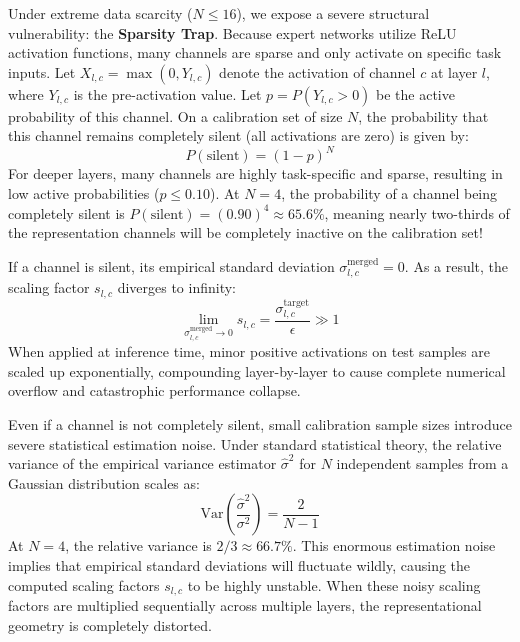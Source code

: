 \documentclass{article}
\begin{document}
Under extreme data scarcity ($N \le 16$), we expose a severe structural vulnerability: the \textbf{Sparsity Trap}. Because expert networks utilize ReLU activation functions, many channels are sparse and only activate on specific task inputs. Let $X_{l,c} = \max(0, Y_{l,c})$ denote the activation of channel $c$ at layer $l$, where $Y_{l,c}$ is the pre-activation value. Let $p = P(Y_{l,c} > 0)$ be the active probability of this channel. On a calibration set of size $N$, the probability that this channel remains completely silent (all activations are zero) is given by:
\begin{equation}
P(\text{silent}) = (1 - p)^N
\end{equation}
For deeper layers, many channels are highly task-specific and sparse, resulting in low active probabilities ($p \le 0.10$). At $N=4$, the probability of a channel being completely silent is $P(\text{silent}) = (0.90)^4 \approx 65.6\%$, meaning nearly two-thirds of the representation channels will be completely inactive on the calibration set!

If a channel is silent, its empirical standard deviation $\sigma^{\text{merged}}_{l,c} = 0$. As a result, the scaling factor $s_{l,c}$ diverges to infinity:
\begin{equation}
\lim_{\sigma^{\text{merged}}_{l,c} \to 0} s_{l,c} = \frac{\sigma^{\text{target}}_{l,c}}{\epsilon} \gg 1
\end{equation}
When applied at inference time, minor positive activations on test samples are scaled up exponentially, compounding layer-by-layer to cause complete numerical overflow and catastrophic performance collapse. 

Even if a channel is not completely silent, small calibration sample sizes introduce severe statistical estimation noise. Under standard statistical theory, the relative variance of the empirical variance estimator $\hat{\sigma}^2$ for $N$ independent samples from a Gaussian distribution scales as:
\begin{equation}
\text{Var}\left(\frac{\hat{\sigma}^2}{\sigma^2}\right) = \frac{2}{N-1}
\end{equation}
At $N=4$, the relative variance is $2/3 \approx 66.7\%$. This enormous estimation noise implies that empirical standard deviations will fluctuate wildly, causing the computed scaling factors $s_{l,c}$ to be highly unstable. When these noisy scaling factors are multiplied sequentially across multiple layers, the representational geometry is completely distorted.
\end{document}

